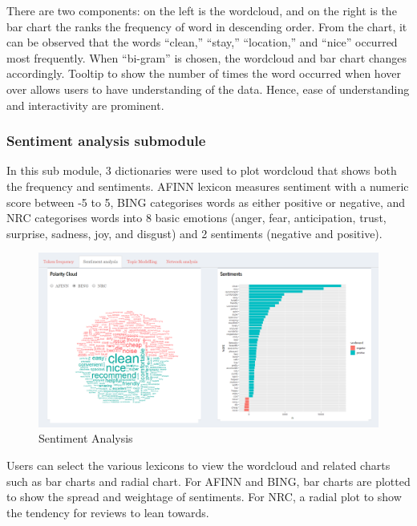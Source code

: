 \documentclass{acm_proc_article-sp}
\begin{document}
There are two components: on the left is the wordcloud, and on the right
is the bar chart the ranks the frequency of word in descending order.
From the chart, it can be observed that the words ``clean,'' ``stay,''
``location,'' and ``nice'' occurred most frequently. When ``bi-gram'' is
chosen, the wordcloud and bar chart changes accordingly. Tooltip to show
the number of times the word occurred when hover over allows users to
have understanding of the data. Hence, ease of understanding and
interactivity are prominent.

\hypertarget{sentiment-analysis-submodule}{%
\subsubsection{Sentiment analysis
submodule}\label{sentiment-analysis-submodule}}

In this sub module, 3 dictionaries were used to plot wordcloud that
shows both the frequency and sentiments. AFINN lexicon measures
sentiment with a numeric score between -5 to 5, BING categorises words
as either positive or negative, and NRC categorises words into 8 basic
emotions (anger, fear, anticipation, trust, surprise, sadness, joy, and
disgust) and 2 sentiments (negative and positive).

\begin{figure}[H]

{\centering \includegraphics[width=1\linewidth]{images/bingsentiment} 

}

\caption{Sentiment Analysis}\label{fig:unnamed-chunk-6}
\end{figure}

Users can select the various lexicons to view the wordcloud and related
charts such as bar charts and radial chart. For AFINN and BING, bar
charts are plotted to show the spread and weightage of sentiments. For
NRC, a radial plot to show the tendency for reviews to lean towards.
\end{document}
